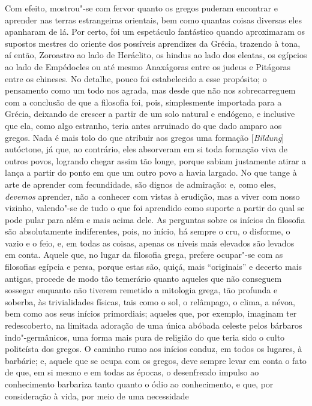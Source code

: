Com efeito, mostrou"-se com fervor quanto os gregos puderam encontrar e
aprender nas terras estrangeiras orientais, bem como quantas coisas diversas
eles apanharam de lá. Por certo, foi um espetáculo fantástico quando
aproximaram os supostos mestres do oriente dos possíveis aprendizes da
Grécia, trazendo à tona, aí então, Zoroastro ao lado de Heráclito, os hindus
ao lado dos eleatas, os egípcios ao lado de Empédocles ou até mesmo
Anaxágoras entre os judeus e Pitágoras entre os chineses. No detalhe, pouco
foi estabelecido a esse propósito; o pensamento como um todo nos agrada, mas
desde que não nos sobrecarreguem com a conclusão de que a filosofia foi,
pois, simplesmente importada para a Grécia, deixando de crescer a partir de
um solo natural e endógeno, e inclusive que ela, como algo estranho, teria
antes arruinado do que dado amparo aos gregos. Nada é mais tolo do que
atribuir aos gregos uma formação [\textit{Bildung}] autóctone, já que, ao
contrário, eles absorveram em si toda formação viva de outros povos, logrando
chegar assim tão longe, porque sabiam justamente atirar a lança a partir do
ponto em que um outro povo a havia largado. No que tange à arte de aprender
com fecundidade, são dignos de admiração: e, como eles, \textit{devemos} 
aprender, não a conhecer com vistas à erudição, mas a viver com nosso vizinho, 
valendo"-se de tudo o que foi aprendido como suporte a partir do qual se pode 
pular para além e mais acima dele. As perguntas sobre \label{perguntassobreosinicios} 
os inícios da filosofia são absolutamente indiferentes, pois, no início, 
há sempre o cru, o disforme, o vazio e o feio, e, em todas as coisas, apenas os 
níveis mais elevados são levados em conta. Aquele que, no lugar da filosofia 
grega, prefere ocupar"-se com as filosofias
egípcia e persa, porque estas são, quiçá, mais ``originais'' e decerto mais
antigas, procede de modo tão temerário quanto aqueles que não conseguem
sossegar enquanto não tiverem remetido a mitologia grega, tão profunda e
soberba, às trivialidades físicas, tais como o sol, o relâmpago, o clima, a
névoa, bem como aos seus inícios primordiais; aqueles que, por exemplo,
imaginam ter redescoberto, na limitada adoração de uma única abóbada celeste
pelos bárbaros indo"-germânicos, uma forma mais pura de religião do que teria
sido o culto politeísta dos gregos. O caminho rumo aos inícios conduz, em
todos os lugares, à barbárie; e, aquele que se ocupa com os gregos, deve
sempre levar em conta o fato de que, em si mesmo e em todas as épocas, o
desenfreado impulso ao conhecimento barbariza tanto quanto o ódio ao
conhecimento, e que, por consideração à vida, por meio de uma necessidade
